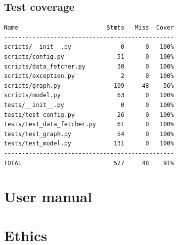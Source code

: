 \documentclass[12pt,a4paper]{report}
\begin{document}
\section*{Test coverage}
\begin{lstlisting}
Name                         Stmts   Miss  Cover
------------------------------------------------
scripts/__init__.py              0      0   100%
scripts/config.py               51      0   100%
scripts/data_fetcher.py         30      0   100%
scripts/exception.py             2      0   100%
scripts/graph.py               109     48    56%
scripts/model.py                63      0   100%
tests/__init__.py                0      0   100%
tests/test_config.py            26      0   100%
tests/test_data_fetcher.py      61      0   100%
tests/test_graph.py             54      0   100%
tests/test_model.py            131      0   100%
------------------------------------------------
TOTAL                          527     48    91%
\end{lstlisting}

\chapter{User manual}
\chapter{Ethics}

\end{document}

